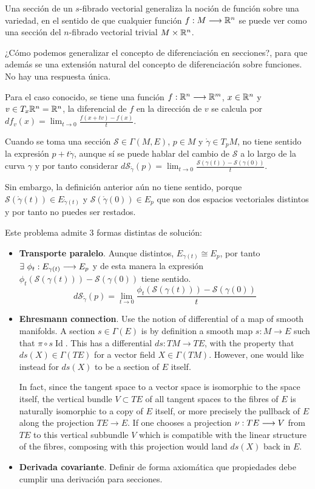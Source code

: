 Una sección de un $s$-fibrado vectorial generaliza la noción de función sobre una variedad, en el sentido de
que cualquier
función $f:M\longrightarrow \mathbb{R}^n$ se puede ver como una sección del $n$-fibrado vectorial trivial $M\times\mathbb{R}^n$.

¿Cómo podemos generalizar el concepto de diferenciación en secciones?, para que además se una extensión natural del
concepto de diferenciación sobre funciones.
No hay una respuesta única.

Para el caso conocido, se tiene una función $f:\mathbb{R}^n\longrightarrow \mathbb{R}^m$, $x\in\mathbb{R}^n$ y $v\in T_x \mathbb{R}^n=\mathbb{R}^n$, la diferencial
de $f$ en la dirección de $v$ se calcula por $df_v(x)=\lim_{t\to 0}{\frac {f(x+tv)-f(x)}{t}}$.

Cuando se toma una sección $\mathcal{S}\in\Gamma(M, E)$, $p\in M$ y $\mathring{\gamma}\in T_p M$, no tiene sentido la
expresión $p+t\mathring{\gamma}$, aunque sí se puede hablar del cambio de $\mathcal{S}$ a lo largo de la curva $\gamma$
y por tanto considerar $d\mathcal{S}_{\mathring{\gamma}}(p)=\lim_{t\to 0}\frac{\mathcal{S}(\gamma (t))-\mathcal{S}
(\gamma (0))}{t}$.

Sin embargo, la definición anterior aún no tiene sentido, porque $\mathcal{S}(\mathring{\gamma}(t))\in
E_{\mathring{\gamma}(t)}$ y $\mathcal{S}(\mathring{\gamma}(0))\in E_p$ que son dos espacios vectoriales distintos y
por tanto no puedes ser restados.

Este problema admite 3 formas distintas de solución:
\begin{itemize}
  \item \textbf{Transporte paralelo}.
  Aunque distintos, $E_{\gamma(t)}\cong E_p$, por tanto $\exists\ \phi_t:E_{\gamma(t)
  }\longrightarrow E_p$ y de esta manera la expresión $\phi_t(\mathcal{S}(\gamma (t)))-\mathcal{S}(\gamma (0))$ tiene sentido.
  \[
    d\mathcal{S}_{\mathring{\gamma}}(p)=\lim_{t\to 0}\frac{\phi_t(\mathcal{S}(\gamma (t)))-\mathcal{S}
    (\gamma (0))}{t}
  \]

  \item \textbf{Ehresmann connection}.
  Use the notion of differential of a map of smooth manifolds.
  A section $s\in \Gamma (E)$ is by definition a smooth map $s:M\to E$ such
  that $\pi \circ s\operatorname{Id}$.
  This has a differential $ds:TM\to TE$, with the property that $ds(X)\in \Gamma (TE)$
  for a vector field $X\in \Gamma (TM)$.
  However, one would like instead for $ds(X)$ to be a section of $E$ itself.

  In fact, since the tangent space to a vector space is isomorphic to the space itself, the vertical bundle
  $V\subset TE$ of all tangent spaces to the fibres of $E$ is naturally isomorphic to a copy of $E$
  itself, or more precisely the pullback of $E$ along the projection $TE\to E$.
  If one chooses a projection $\nu:TE\longrightarrow V$ from $TE$ to this vertical subbundle
  $V$ which is compatible with the linear structure of the fibres, composing with this projection would land
  $ds(X)$ back in $E$.


  \item \textbf{Derivada covariante}.
  Definir de forma axiomática que propiedades debe cumplir una derivación para secciones.
\end{itemize}

